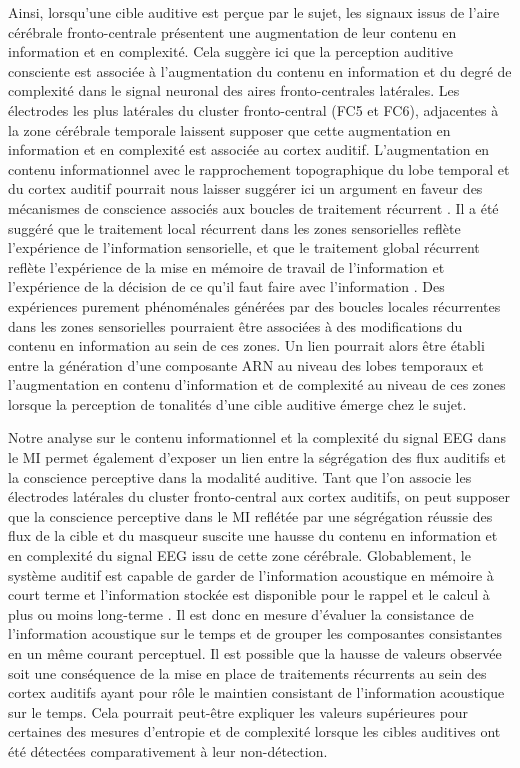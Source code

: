 Ainsi, lorsqu'une cible auditive est perçue par le sujet, les signaux issus de l'aire cérébrale fronto-centrale présentent une augmentation de leur contenu en information et en complexité. 
Cela suggère ici que la perception auditive consciente est associée à l'augmentation du contenu en information et du degré de complexité dans le signal neuronal des aires fronto-centrales latérales.
Les électrodes les plus latérales du cluster fronto-central (FC5 et FC6), adjacentes à la zone cérébrale temporale laissent supposer que cette augmentation en information et en complexité est associée au cortex auditif. 
L'augmentation en contenu informationnel avec le rapprochement topographique du lobe temporal et du cortex auditif pourrait nous laisser suggérer ici un argument en faveur des mécanismes de conscience associés aux boucles de traitement récurrent \citep{lamme2000distinct, lamme2003visual, lamme2006towards}. 
Il a été suggéré que le traitement local récurrent dans les zones sensorielles reflète l'expérience de l'information sensorielle, et que le traitement global récurrent reflète l'expérience de la mise en mémoire de travail de l'information et l'expérience de la décision de ce qu'il faut faire avec l'information \citep{eklund2019electrophysiological, lamme2000distinct, lamme2003visual, lamme2006towards}.
Des expériences purement phénoménales générées par des boucles locales récurrentes dans les zones sensorielles pourraient être associées à des modifications du contenu en information au sein de ces zones. 
Un lien pourrait alors être établi entre la génération d'une composante ARN au niveau des lobes temporaux et l'augmentation en contenu d'information et de complexité au niveau de ces zones lorsque la perception de tonalités d'une cible auditive émerge chez le sujet. 

Notre analyse sur le contenu informationnel et la complexité du signal EEG dans le MI permet également d'exposer un lien entre la ségrégation des flux auditifs et la conscience perceptive dans la modalité auditive. 
Tant que l'on associe les électrodes latérales du cluster fronto-central aux cortex auditifs, on peut supposer que la conscience perceptive dans le MI reflétée par une ségrégation réussie des flux de la cible et du masqueur suscite une hausse du contenu en information et en complexité du signal EEG issu de cette zone cérébrale. 
Globablement, le système auditif est capable de garder de l’information acoustique en mémoire à court terme et l’information stockée est disponible pour le rappel et le calcul à plus ou moins long-terme \citep{shen2017auditory}. 
Il est donc en mesure d’évaluer la consistance de l’information acoustique sur le temps et de grouper les composantes consistantes en un même courant perceptuel. 
Il est possible que la hausse de valeurs observée soit une conséquence de la mise en place de traitements récurrents au sein des cortex auditifs ayant pour rôle le maintien consistant de l'information acoustique sur le temps. 
Cela pourrait peut-être expliquer les valeurs supérieures pour certaines des mesures d'entropie et de complexité lorsque les cibles auditives ont été détectées comparativement à leur non-détection. 

